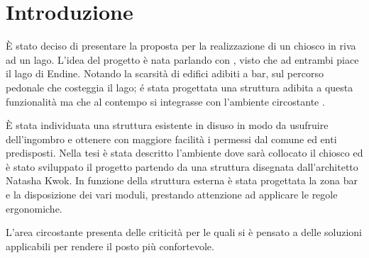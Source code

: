 \section{Introduzione}
È stato deciso di presentare la proposta per la realizzazione di un chiosco in riva ad un lago. L'idea del progetto è nata parlando con , visto che ad entrambi piace il lago di Endine. Notando  la scarsità di edifici adibiti a bar, sul percorso pedonale che costeggia il lago; é stata progettata una struttura adibita a questa funzionalità  ma che al contempo si integrasse con l’ambiente circostante .

È stata individuata una struttura esistente in disuso in modo da usufruire dell'ingombro e ottenere con maggiore facilità i permessi dal comune ed enti predisposti. Nella tesi è stata descritto l’ambiente dove sarà collocato il chiosco ed è stato sviluppato il progetto partendo da una struttura disegnata dall'architetto Natasha Kwok. In funzione della struttura esterna è stata progettata la zona bar e la disposizione dei vari moduli, prestando attenzione ad applicare le regole ergonomiche.

L'area circostante presenta delle criticità per le quali si è pensato a delle soluzioni applicabili per rendere il posto più confortevole.
